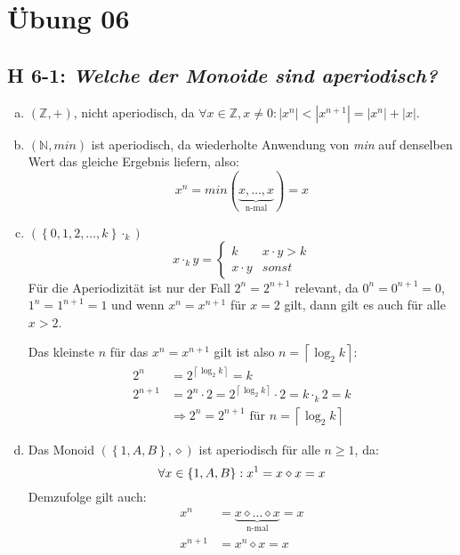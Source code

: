 \documentclass{scrartcl}
\begin{document}
\section{Übung 06}

\subsection{H 6-1: \textsl{Welche der Monoide sind aperiodisch?}}

\begin{enumerate}[a)]
  \item $\left(\mathbb{Z}, +\right)$, nicht aperiodisch, da
    $\forall x \in \mathbb{Z}, x \neq 0 : \left|x^n\right| < \left|x^{n+1}\right| = \left|x^n\right| + \left|x\right|$.
  \item $\left(\mathbb{N}, min\right)$ ist aperiodisch, da wiederholte Anwendung von \textit{min} auf denselben Wert das gleiche Ergebnis liefern, also:
  $$x^n = min(\underbrace{x, \ldots, x}_{\text{n-mal}}) = x$$
  \newcommand{\cn}{\cdot_k}
  \item $\left(\left\{0,1,2,\ldots,k\right\}\cn \right)$
  $$x\cn y =
    \begin{cases}
      k           & x \cdot y > k\\
      x \cdot y   & sonst
    \end{cases}
  $$
  Für die Aperiodizität ist nur der Fall $2^n = 2^{n+1}$ relevant, da $0^n = 0^{n+1} = 0$,
  $1^n = 1^{n+1} = 1$ und wenn $x^n = x^{n+1}$ für $x = 2$ gilt, dann gilt es auch für
  alle $x > 2$.

  Das kleinste $n$ für das $x^n = x^{n+1}$ gilt ist also $n = \left\lceil \log_2 k \right\rceil$:
  \begin{align*}
    2^n &= 2^{\left\lceil \log_2 k \right\rceil} = k\\
    2^{n+1} &= 2^n \cdot 2 = 2^{\left\lceil \log_2 k \right\rceil} \cdot 2 = k \cn 2 = k\\
    &\Rightarrow 2^n = 2^{n+1} \text{ für } n = \left\lceil \log_2 k \right\rceil
  \end{align*}
  \item Das Monoid $\left(\left\{1,A,B\right\}, \diamond\right)$ ist aperiodisch für alle $n \geq 1$, da:
  $$
    \forall x \in \{1,A,B\} : x^1 = x \diamond x = x\\
  $$
  Demzufolge gilt auch:
  \begin{align*}
    x^n &= \underbrace{x \diamond \ldots \diamond x}_{\text{n-mal}} = x\\
    x^{n+1} &= x^n \diamond x = x
  \end{align*}
\end{enumerate}
\end{document}
